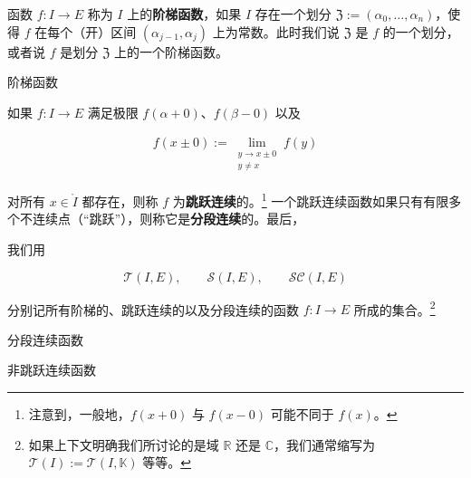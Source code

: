 函数 $ f : I \to E $ 称为 $ I $ 上的\textbf{阶梯函数}，如果 $ I $ 存在一个划分 $ \mathfrak{Z} := (\alpha_0, \ldots, \alpha_n) $，使得 $ f $ 在每个（开）区间 $ (\alpha_{j-1}, \alpha_j) $ 上为常数。此时我们说 $ \mathfrak{Z} $ 是 $ f $ 的一个划分，或者说 $ f $ 是划分 $ \mathfrak{Z} $ 上的一个阶梯函数。


阶梯函数

如果 $ f : I \to E $ 满足极限 $ f(\alpha + 0) $、$ f(\beta - 0) $ 以及

\begin{equation*}
\begin{aligned}
f(x \pm 0) := \lim_{\substack{y \to x \pm 0 \\ y \ne x}} f(y)
\end{aligned}
\end{equation*}

对所有 $ x \in \mathring{I} $ 都存在，则称 $ f $ 为\textbf{跳跃连续}的。\footnote{注意到，一般地，$ f(x + 0) $ 与 $ f(x - 0) $ 可能不同于 $ f(x) $。} 一个跳跃连续函数如果只有有限多个不连续点（“跳跃”），则称它是\textbf{分段连续}的。最后，

我们用

\[
\mathcal{T}(I, E), \qquad \mathcal{S}(I, E), \qquad \mathcal{SC}(I, E)
\]

分别记所有阶梯的、跳跃连续的以及分段连续的函数 $ f : I \to E $ 所成的集合。\footnote{如果上下文明确我们所讨论的是域 $ \mathbb{R} $ 还是 $ \mathbb{C} $，我们通常缩写为 $ \mathcal{T}(I) := \mathcal{T}(I, \mathbb{K}) $ 等等。}


分段连续函数


非跳跃连续函数


